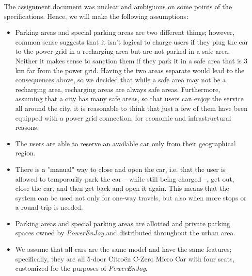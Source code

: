 The assignment document was unclear and ambiguous on some points of the specifications. Hence, we will make the following assumptions:
			
			\begin{itemize}
				\item Parking areas and special parking areas are two different things; however, common sense suggests that it isn't logical to charge users if they plug the car to the power grid in a recharging area but are not parked in a safe area. Neither it makes sense to sanction them if they park it in a safe area that is 3 km far from the power grid. Having the two areas separate would lead to the consequences above, so we decided that while a safe area may not be a recharging area, recharging areas are always safe areas. %
				Furthermore, assuming that a city has many safe areas, so that users can enjoy the service all around the city, it is reasonable to think that just a few of them have been equipped with a power grid connection, for economic and infrastructural reasons.
				
				\item The users are able to reserve an available car only from their geographical region. %
				
				\item There is a "manual" way to close and open the car, i.e. that the user is allowed to temporarily park the car – while still being charged –, get out, close the car, and then get back and open it again. This means that the system can be used not only for one-way travels, but also when more stops or a round trip is needed.
				
				\item Parking areas and special parking areas are allotted and private parking spaces owned by \textit{PowerEnJoy} and distributed throughout the urban area. %
				
				\item We assume that all cars are the same model and have the same features; specifically, they are all 5-door Citroën C-Zero Micro Car with four seats, customized for the purposes of \textit{PowerEnJoy}. %
				

\end{itemize}
